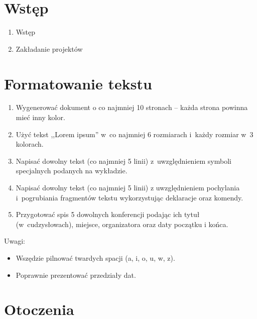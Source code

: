 \documentclass[a4paper,12pt]{article}
\begin{document}
\section{Wstęp}

\begin{enumerate}
    \item Wstęp
    \item Zakładanie projektów
\end{enumerate}

\section{Formatowanie tekstu}

\begin{enumerate}
    \item Wygenerować dokument o co najmniej 10 stronach -- każda strona powinna mieć inny kolor.
    \item Użyć tekst ,,Lorem ipsum'' w~co najmniej 6 rozmiarach i~każdy rozmiar w~3 kolorach.
    \item Napisać dowolny tekst (co najmniej 5 linii) z~uwzględnieniem symboli specjalnych podanych na wykładzie.
    \item Napisać dowolny tekst (co najmniej 5 linii) z uwzględnieniem pochylania i~pogrubiania fragmentów tekstu wykorzystując deklaracje oraz komendy.
    \item Przygotować spis 5 dowolnych konferencji podając ich tytuł (w~cudzysłowach), miejsce, organizatora oraz daty początku i końca.
\end{enumerate}

Uwagi:

\begin{itemize}
    \item Wszędzie pilnować twardych spacji (a, i, o, u, w, z).
    \item Poprawnie prezentować przedziały dat.
\end{itemize}

\section{Otoczenia}
\end{document}
